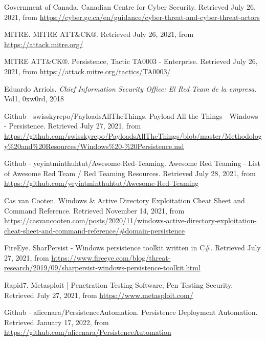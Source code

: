 \begin{thebibliography}{99}

Government of Canada.
Canadian Centre for Cyber Security.
Retrieved July 26, 2021, from \url{https://cyber.gc.ca/en/guidance/cyber-threat-and-cyber-threat-actors}

MITRE.
MITRE ATT\&CK®.
Retrieved July 26, 2021, from \url{https://attack.mitre.org/}

MITRE ATT\&CK®.
Persistence, Tactic TA0003 - Enterprise.
Retrieved July 26, 2021, from \url{https://attack.mitre.org/tactics/TA0003/}

Eduardo Arriols. 
\emph{Chief Information Security Office: El Red Team de la empresa}. 
Vol1, 0xw0rd, 2018

Github - swisskyrepo/PayloadsAllTheThings.
Payload All the Things - Windows - Persistence.
Retrieved July 27, 2021, from \url{https://github.com/swisskyrepo/PayloadsAllTheThings/blob/master/Methodology\%20and\%20Resources/Windows\%20-\%20Persistence.md}

Github - yeyintminthuhtut/Awesome-Red-Teaming.
Awesome Red Teaming - List of Awesome Red Team / Red Teaming Resources.
Retrieved July 28, 2021, from \url{https://github.com/yeyintminthuhtut/Awesome-Red-Teaming}

Cas van Cooten.
Windows \& Active Directory Exploitation Cheat Sheet and Command Reference.
Retrieved November 14, 2021, from \url{https://casvancooten.com/posts/2020/11/windows-active-directory-exploitation-cheat-sheet-and-command-reference/#domain-persistence}


FireEye.
SharPersist - Windows persistence toolkit written in C\#.
Retrieved July 27, 2021, from \url{https://www.fireeye.com/blog/threat-research/2019/09/sharpersist-windows-persistence-toolkit.html}

Rapid7.
Metasploit | Penetration Testing Software, Pen Testing Security.
Retrieved July 27, 2021, from \url{https://www.metasploit.com/}


Github - alicenara/PersistenceAutomation. 
Persistence Deployment Automation.
Retrieved January 17, 2022, from \url{https://github.com/alicenara/PersistenceAutomation}


\end{thebibliography}

